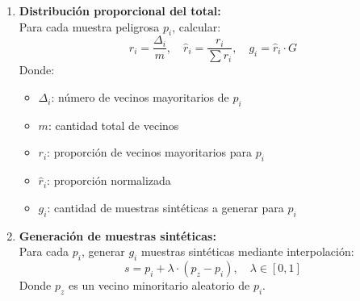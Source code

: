 \documentclass[12pt]{article}
\begin{document}
\begin{enumerate}[label=\textbf{\arabic*.}]
    \item \textbf{Distribución proporcional del total:}\\
    Para cada muestra peligrosa \( p_i \), calcular:
    \[
    r_i = \frac{\Delta_i}{m}, \quad 
    \hat{r}_i = \frac{r_i}{\sum r_i}, \quad 
    g_i = \hat{r}_i \cdot G
    \]
    Donde:
    \begin{itemize}
        \item \( \Delta_i \): número de vecinos mayoritarios de \( p_i \)
        \item \( m \): cantidad total de vecinos
        \item \( r_i \): proporción de vecinos mayoritarios para \( p_i \)
        \item \( \hat{r}_i \): proporción normalizada
        \item \( g_i \): cantidad de muestras sintéticas a generar para \( p_i \)
    \end{itemize}

    \item \textbf{Generación de muestras sintéticas:}\\
    Para cada \( p_i \), generar \( g_i \) muestras sintéticas mediante interpolación:
    \[
    s = p_i + \lambda \cdot (p_z - p_i), \quad \lambda \in [0, 1]
    \]
    Donde \( p_z \) es un vecino minoritario aleatorio de \( p_i \).
\end{enumerate}
\end{document}
